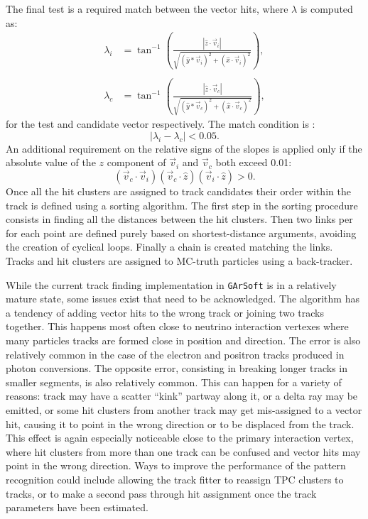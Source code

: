The final test is a required match between the vector hits, where $\lambda$ is computed as:
\begin{equation}
    \begin{aligned}
        \lambda_i&=\tan^{-1}\left(\frac{|\hat{z}\cdot\Vec{v}_i|}{\sqrt{(\hat{y}*\Vec{v}_i)^2+(\hat{x}\cdot\Vec{v}_i)^2}}\right),\\\\
        \lambda_c&=\tan^{-1}\left(\frac{|\hat{z}\cdot\Vec{v}_c|}{\sqrt{(\hat{y}*\Vec{v}_c)^2+(\hat{x}\cdot\Vec{v}_c)^2}}\right),
    \end{aligned}
\end{equation}
for the test and candidate vector respectively. The match condition is :
\begin{equation}
    |\lambda_i-\lambda_c|<0.05.
\end{equation}
An additional requirement on the relative signs of the slopes is applied only if the absolute value of the $z$ component of $\Vec{v}_i$ and $\Vec{v}_c$ both exceed 0.01:
\begin{equation}
    (\Vec{v}_c\cdot\Vec{v}_i)(\Vec{v}_c\cdot\hat{z})(\Vec{v}_i\cdot\hat{z})>0.
\end{equation}
Once all the hit clusters are assigned to track candidates their order within the track is defined using a sorting algorithm. The first step in the sorting procedure consists in finding all the distances between the hit clusters. Then two links per for each point are defined purely based on shortest-distance arguments, avoiding the creation of cyclical loops. Finally a chain is created matching the links. Tracks and hit clusters are assigned to MC-truth particles using a back-tracker.

While the current track finding implementation in \texttt{GArSoft} is in a relatively mature state, some issues exist that need to be acknowledged. The algorithm has a tendency of adding vector hits to the wrong track or joining two tracks together. This happens most often close to neutrino interaction vertexes where many particles tracks are formed close in position and direction. The error is also relatively common in the case of the electron and positron tracks produced in photon conversions. The opposite error, consisting in breaking longer tracks in smaller segments, is also relatively common. This can happen for a variety of reasons: track may have a scatter \enquote{kink} partway along it, or a delta ray may be emitted, or some hit clusters from another track may get mis-assigned to a vector hit, causing it to point in the wrong direction or to be displaced from the track. This effect is again especially noticeable close to the primary interaction vertex, where hit clusters from more than one track can be confused and vector hits may point in the wrong direction. Ways to improve the performance of the pattern recognition could include allowing the track fitter to reassign TPC clusters to tracks, or to make a second pass through hit assignment once the track parameters have been estimated.
